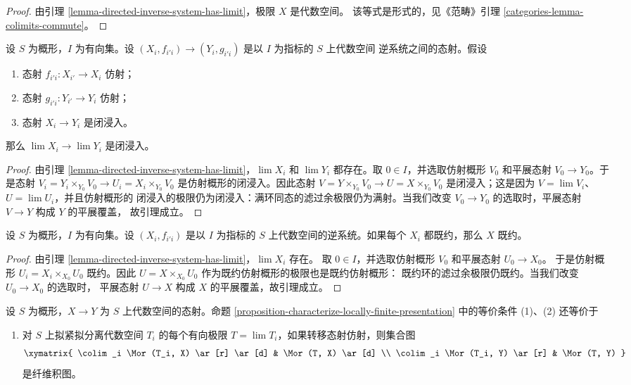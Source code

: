 \begin{proof}
由引理 \ref{lemma-directed-inverse-system-has-limit}，极限 $X$ 是代数空间。
该等式是形式的，见《范畴》引理
\ref{categories-lemma-colimits-commute}。
\end{proof}

\begin{lemma}
\label{lemma-directed-inverse-system-closed-immersions}
设 $S$ 为概形，$I$ 为有向集。设
$(X_i,f_{i'i})\to(Y_i,g_{i'i})$ 是以 $I$ 为指标的 $S$ 上代数空间
逆系统之间的态射。假设
\begin{enumerate}
\item 态射 $f_{i'i}:X_{i'}\to X_i$ 仿射；
\item 态射 $g_{i'i}:Y_{i'}\to Y_i$ 仿射；
\item 态射 $X_i\to Y_i$ 是闭浸入。
\end{enumerate}
那么 $\lim X_i\to\lim Y_i$ 是闭浸入。
\end{lemma}

\begin{proof}
由引理 \ref{lemma-directed-inverse-system-has-limit}，$\lim X_i$ 和
$\lim Y_i$ 都存在。取 $0\in I$，并选取仿射概形 $V_0$ 和平展态射
$V_0\to Y_0$。于是态射
$V_i=Y_i\times_{Y_0}V_0\to U_i=X_i\times_{Y_0}V_0$%
是仿射概形的闭浸入。因此态射
$V=Y\times_{Y_0}V_0\to U=X\times_{Y_0}V_0$%
是闭浸入；这是因为 $V=\lim V_i$、$U=\lim U_i$，并且仿射概形的
闭浸入的极限仍为闭浸入：满环同态的滤过余极限仍为满射。当我们改变
$V_0\to Y_0$ 的选取时，平展态射 $V\to Y$ 构成 $Y$ 的平展覆盖，
故引理成立。
\end{proof}

\begin{lemma}
\label{lemma-directed-inverse-system-reduced}
设 $S$ 为概形，$I$ 为有向集。设 $(X_i,f_{i'i})$ 是以 $I$ 为指标的
$S$ 上代数空间的逆系统。如果每个 $X_i$ 都既约，那么 $X$ 既约。
\end{lemma}

\begin{proof}
由引理 \ref{lemma-directed-inverse-system-has-limit}，$\lim X_i$ 存在。
取 $0\in I$，并选取仿射概形 $V_0$ 和平展态射
$U_0\to X_0$。%
于是仿射概形 $U_i=X_i\times_{X_0}U_0$ 既约。因此
$U=X\times_{X_0}U_0$ 作为既约仿射概形的极限也是既约仿射概形：
既约环的滤过余极限仍既约。当我们改变 $U_0\to X_0$ 的选取时，
平展态射 $U\to X$ 构成 $X$ 的平展覆盖，故引理成立。
\end{proof}

\begin{lemma}
\label{lemma-better-characterize-relative-limit-preserving}
设 $S$ 为概形，$X\to Y$ 为 $S$ 上代数空间的态射。命题
\ref{proposition-characterize-locally-finite-presentation} 中的等价条件
(1)、(2) 还等价于
\begin{enumerate}
\item[(3)] 对 $S$ 上拟紧拟分离代数空间 $T_i$ 的每个有向极限
$T=\lim T_i$，如果转移态射仿射，则集合图
$$
\xymatrix{
\colim_i \Mor(T_i, X) \ar[r] \ar[d] & \Mor(T, X) \ar[d] \\
\colim_i \Mor(T_i, Y) \ar[r] & \Mor(T, Y)
}
$$
是纤维积图。
\end{enumerate}
\end{lemma}

